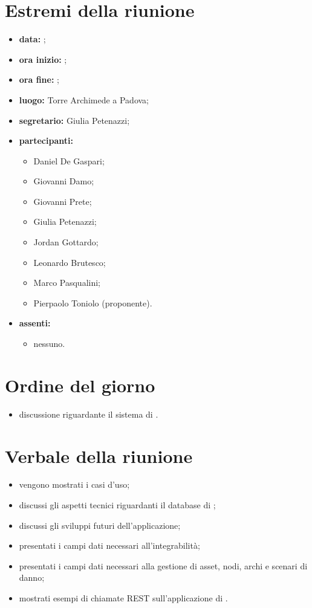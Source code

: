 \documentclass[a4paper,11pt]{article}
\begin{document}
	\section{Estremi della riunione}
	\begin{itemize}
		\item \textbf{data:} ;
		\item \textbf{ora inizio:} ;
		\item \textbf{ora fine:} ;
		\item \textbf{luogo:} Torre Archimede a Padova;
		\item \textbf{segretario:} Giulia Petenazzi;
		\item \textbf{partecipanti:}
		\begin{itemize}
			 \item Daniel De Gaspari;
			 \item Giovanni Damo;
			 \item Giovanni Prete;
			 \item Giulia Petenazzi;
			 \item Jordan Gottardo;
			 \item Leonardo Brutesco;
			 \item Marco Pasqualini;
			 \item Pierpaolo Toniolo (proponente).
		\end{itemize}
		\item \textbf{assenti:}
			\begin{itemize}
				\item nessuno.
			\end{itemize}
	\end{itemize}
	\section{Ordine del giorno}
		\begin{itemize}
			\item discussione riguardante il sistema di \riskapp.
		\end{itemize}
	\section{Verbale della riunione}
	\begin{itemize}
		\item vengono mostrati i casi d'uso;
        \item discussi gli aspetti tecnici riguardanti il database di \riskapp;
        \item discussi gli sviluppi futuri dell'applicazione;
        \item presentati i campi dati necessari all'integrabilità;
		\item presentati i campi dati necessari alla gestione di asset, nodi, archi e scenari di danno;
		\item mostrati esempi di chiamate REST sull'applicazione di \riskapp.
	\end{itemize}
\end{document}
